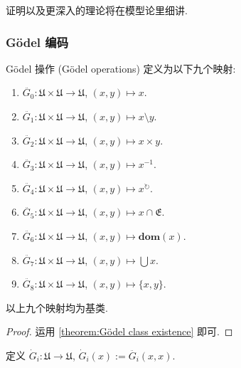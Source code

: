 证明以及更深入的理论将在模型论里细讲.

\subsubsection{Gödel 编码}

\begin{definition}
    Gödel 操作 (Gödel operations) 定义为以下九个映射:
    \begin{enumerate}
        \item \(\ddot{G_0} : \mathfrak{U} \times \mathfrak{U} \to \mathfrak{U}\), \((x,y) \mapsto x\).
        \item \(\ddot{G_1} : \mathfrak{U} \times \mathfrak{U} \to \mathfrak{U}\), \((x,y) \mapsto x \setminus y\).
        \item \(\ddot{G_2} : \mathfrak{U} \times \mathfrak{U} \to \mathfrak{U}\), \((x,y) \mapsto x \times y\).
        \item \(\ddot{G_3} : \mathfrak{U} \times \mathfrak{U} \to \mathfrak{U}\), \((x,y) \mapsto x^{-1}\).
        \item \(\ddot{G_4} : \mathfrak{U} \times \mathfrak{U} \to \mathfrak{U}\), \((x,y) \mapsto x^{\circlearrowright}\).
        \item \(\ddot{G_5} : \mathfrak{U} \times \mathfrak{U} \to \mathfrak{U}\), \((x,y) \mapsto x \cap \mathfrak{E}\).
        \item \(\ddot{G_6} : \mathfrak{U} \times \mathfrak{U} \to \mathfrak{U}\), \((x,y) \mapsto \mathbf{dom} (x)\).
        \item \(\ddot{G_7} : \mathfrak{U} \times \mathfrak{U} \to \mathfrak{U}\), \((x,y) \mapsto \bigcup x\).
        \item \(\ddot{G_8} : \mathfrak{U} \times \mathfrak{U} \to \mathfrak{U}\), \((x,y) \mapsto \{x,y\}\).
    \end{enumerate}
\end{definition}

\begin{lemma}
    以上九个映射均为基类.

    \begin{proof}
        运用 \ref{theorem:Gödel class existence} 即可.
    \end{proof}
\end{lemma}

\begin{definition}
    定义 \(\dot G_i : \mathfrak{U} \to \mathfrak{U}\), \(\dot G_i (x) := \ddot{G_i} (x,x)\).
\end{definition}

